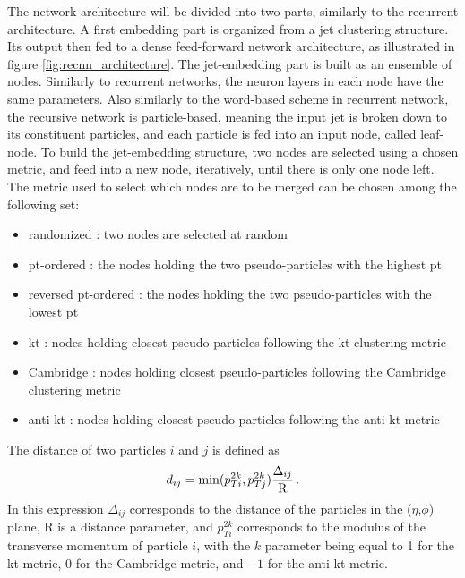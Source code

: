 The network architecture will be divided into two parts, similarly to the recurrent architecture. A first embedding part is organized from a jet clustering structure. Its output then fed to a dense feed-forward network architecture, as illustrated in figure \ref{fig:recnn_architecture}.
The jet-embedding part is built as an ensemble of nodes. Similarly to recurrent networks, the neuron layers in each node have the same parameters. Also similarly to the word-based scheme in recurrent network, the recursive network is particle-based, meaning the input jet is broken down to its constituent particles, and each particle is fed into an input node, called leaf-node. To build the jet-embedding structure, two nodes are selected using a chosen metric, and feed into a new node, iteratively, until there is only one node left. 
The metric used to select which nodes are to be merged can be chosen among the following set:
    
\begin{itemize}
    \item randomized : two nodes are selected at random
    \item pt-ordered : the nodes holding the two pseudo-particles with the highest pt 
    \item reversed pt-ordered : the nodes holding the two pseudo-particles with the lowest pt
    \item kt : nodes holding closest pseudo-particles following the kt clustering metric
    \item Cambridge : nodes holding closest pseudo-particles following the Cambridge clustering metric
    \item anti-kt : nodes holding closest pseudo-particles following the anti-kt metric
\end{itemize}
The distance of two particles $i$ and $j$ is defined as
\begin{equation}
    d_{ij} = \mathrm{min}(p_{Ti}^{2k},p_{Tj}^{2k}) \frac{\Delta_{ij}}{\mathrm{R}} \mend
\end{equation}
In this expression $\Delta_{ij}$ corresponds to the distance of the particles in the ($\eta$,$\phi$) plane, R is a distance parameter, and $p_{Ti}^{2k}$ corresponds to the modulus of the transverse momentum of particle $i$, with the $k$ parameter being equal to 1 for the kt metric, 0 for the Cambridge metric, and $-1$ for the anti-kt metric.

